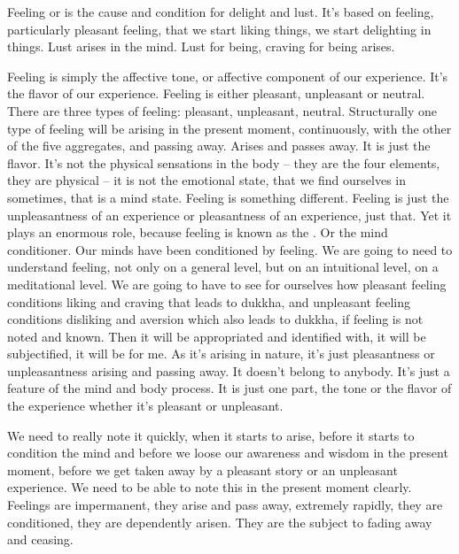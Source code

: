 \documentclass[letterpaper,10pt,english]{sphinxmanual}
\begin{document}
\sphinxAtStartPar
Feeling or
is the cause and condition for delight and lust. It’s
based on feeling, particularly pleasant feeling, that we start liking things, we
start delighting in things. Lust arises in the mind. Lust for being, craving for
being arises.

\sphinxAtStartPar
Feeling  is  simply  the  affective  tone,  or  affective  component  of  our
experience.  It’s  the  flavor  of  our  experience.  Feeling  is  either  pleasant,
unpleasant  or  neutral.  There  are  three  types  of  feeling:  pleasant,  unpleasant,  neutral.  Structurally  one  type  of  feeling  will  be  arising  in  the  present
moment,  continuously,  with  the  other  of  the  five  aggregates,  and  passing
away. Arises and passes away. It is just the flavor. It’s not the physical sensations in the body – they are the four elements, they are physical – it is not
the emotional state, that we find ourselves in sometimes, that is a mind state.
Feeling is something different. Feeling is just the unpleasantness of an experience or pleasantness of an experience, just that. Yet it plays an enormous
role,  because  feeling  is  known  as  the
.  Or  the  mind  conditioner. Our minds have been conditioned by feeling. We are going to need to
understand feeling, not only on a general level, but on an intuitional level,
on a meditational level. We are going to have to see for ourselves how pleasant feeling conditions liking and craving that leads to dukkha, and unpleasant   feeling conditions disliking and aversion which also leads to dukkha, if
feeling is not noted and known. Then it will be appropriated and identified
with, it will be subjectified, it will be for me. As it’s arising in nature, it’s just
pleasantness or unpleasantness arising and passing away. It doesn’t belong to
anybody. It’s just a feature of the mind and body process. It is just one part,
the tone or the flavor of the experience whether it’s pleasant or unpleasant.

\sphinxAtStartPar
We need to really note it quickly, when it starts to arise, before it starts
to condition the mind and before we loose our awareness and wisdom in the
present moment, before we get taken away by a pleasant story or an unpleasant experience. We need to be able to note this in the present moment clearly.
Feelings are impermanent, they arise and pass away, extremely rapidly,
they  are  conditioned,  they  are  dependently  arisen. They  are  the  subject  to
fading away and ceasing.
\end{document}
